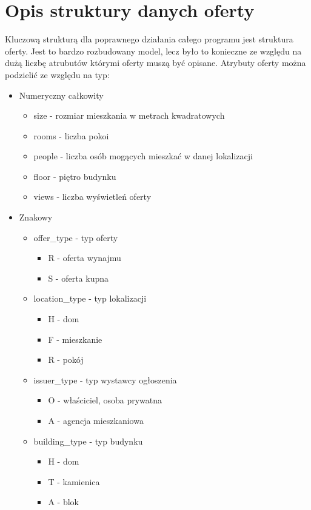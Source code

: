 \section{Opis struktury danych oferty}
\label{sec:strukturaOferty}
Kluczową strukturą dla poprawnego działania całego programu jest struktura oferty. Jest to bardzo rozbudowany model, lecz było to konieczne ze względu na dużą liczbę atrubutów którymi oferty muszą być opisane. Atrybuty oferty można podzielić ze względu na typ:
\begin{itemize}
\item Numeryczny całkowity
\begin{itemize}
\item size - rozmiar mieszkania w metrach kwadratowych
\item rooms - liczba pokoi
\item people - liczba osób mogących mieszkać w danej lokalizacji
\item floor - piętro budynku
\item views - liczba wyświetleń oferty
\end{itemize}
\item Znakowy
\begin{itemize}
\item offer\_type - typ oferty
\begin{itemize}
\item R - oferta wynajmu
\item S - oferta kupna
\end{itemize}
\item location\_type - typ lokalizacji 
\begin{itemize}
\item H - dom
\item F - mieszkanie
\item R - pokój
\end{itemize}
\item issuer\_type - typ wystawcy ogłoszenia 
\begin{itemize}
\item O - właściciel, osoba prywatna
\item A - agencja mieszkaniowa
\end{itemize}
\item building\_type - typ budynku
\begin{itemize}
\item H - dom
\item T - kamienica
\item A - blok
\end{itemize}

\end{itemize}
\end{itemize}

